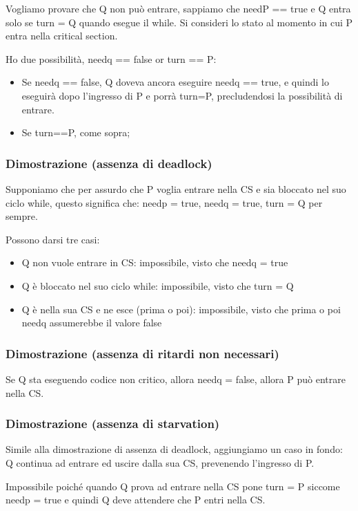 Vogliamo provare che Q non può entrare, sappiamo che needP == true
e Q entra solo se turn = Q quando esegue il while.
Si consideri lo stato al momento in cui P entra nella critical section.

Ho due possibilità, needq == false or turn == P:
\begin{itemize}
    \item Se needq == false, Q doveva ancora eseguire needq == true, e quindi lo eseguirà dopo l'ingresso di P e porrà turn=P, precludendosi la possibilità di entrare.
    \item Se turn==P, come sopra;
\end{itemize}




\subsubsection{Dimostrazione (assenza di deadlock)}

Supponiamo che per assurdo che P voglia entrare nella CS e sia
bloccato nel suo ciclo while, questo significa che: needp = true, needq = true, turn = Q per sempre.

Possono darsi tre casi:
\begin{itemize}
    \item Q non vuole entrare in CS: impossibile, visto che needq = true
    \item Q è bloccato nel suo ciclo while: impossibile, visto che turn = Q
    \item Q è nella sua CS e ne esce (prima o poi): impossibile, visto che prima o poi needq assumerebbe il valore false
\end{itemize}

\subsubsection{Dimostrazione (assenza di ritardi non necessari)}
Se Q sta eseguendo codice non critico, allora needq = false, allora P può entrare nella CS.

\subsubsection{Dimostrazione (assenza di starvation)}
Simile alla dimostrazione di assenza di deadlock, aggiungiamo un caso in fondo:
Q continua ad entrare ed uscire dalla sua CS, prevenendo l'ingresso di P.

Impossibile poiché quando Q prova ad entrare nella CS pone turn = P
siccome needp = true e  quindi Q deve attendere che P entri nella CS.

